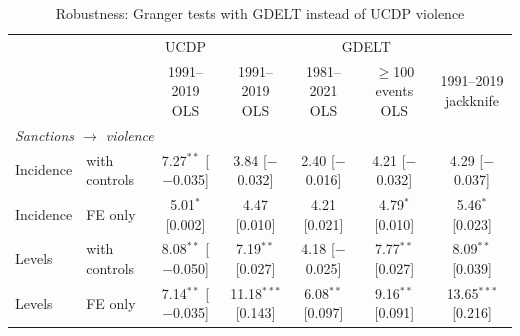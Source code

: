 \begin{table}[htbp]
\centering
\footnotesize
\caption{Robustness: Granger tests with GDELT instead of UCDP violence}
\label{tab:gdelt}
\begin{threeparttable}
\begin{tabular}{llccccc}
\toprule
 & & UCDP & \multicolumn{4}{c}{GDELT} \\
\cmidrule(lr){3-3}\cmidrule(lr){4-7}
 & & \makecell{1991--2019\\OLS} & \makecell{1991--2019\\OLS} & \makecell{1981--2021\\OLS} & \makecell{$\geq$100 events\\OLS} & \makecell{1991--2019\\jackknife} \\
\midrule
\multicolumn{7}{l}{\textit{Sanctions $\rightarrow$ violence}} \\
\quad Incidence & with controls & \makecell{7.27$^{**}$\\{\scriptsize [$-$0.035]}} & \makecell{3.84\\{\scriptsize [$-$0.032]}} & \makecell{2.40\\{\scriptsize [$-$0.016]}} & \makecell{4.21\\{\scriptsize [$-$0.032]}} & \makecell{4.29\\{\scriptsize [$-$0.037]}} \\
\quad Incidence & FE only & \makecell{5.01$^{*}$\\{\scriptsize [0.002]}} & \makecell{4.47\\{\scriptsize [0.010]}} & \makecell{4.21\\{\scriptsize [0.021]}} & \makecell{4.79$^{*}$\\{\scriptsize [0.010]}} & \makecell{5.46$^{*}$\\{\scriptsize [0.023]}} \\
\quad Levels & with controls & \makecell{8.08$^{**}$\\{\scriptsize [$-$0.050]}} & \makecell{7.19$^{**}$\\{\scriptsize [0.027]}} & \makecell{4.18\\{\scriptsize [$-$0.025]}} & \makecell{7.77$^{**}$\\{\scriptsize [0.027]}} & \makecell{8.09$^{**}$\\{\scriptsize [0.039]}} \\
\quad Levels & FE only & \makecell{7.14$^{**}$\\{\scriptsize [$-$0.035]}} & \makecell{11.18$^{***}$\\{\scriptsize [0.143]}} & \makecell{6.08$^{**}$\\{\scriptsize [0.097]}} & \makecell{9.16$^{**}$\\{\scriptsize [0.091]}} & \makecell{13.65$^{***}$\\{\scriptsize [0.216]}} \\

\end{tabular}
\end{threeparttable}
\end{table}
